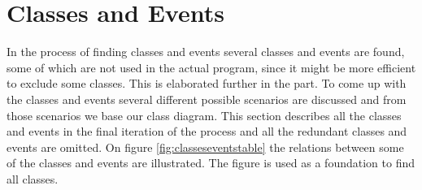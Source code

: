 \section{Classes and Events}
\label{cap:classesevents}
In the process of finding classes and events several classes and events are found, some of which are not used in the actual program, since it might be more efficient to exclude some classes. 
This is elaborated further in the  part. 
To come up with the classes and events several different possible scenarios are discussed and from those scenarios we base our class diagram. 
This section describes all the classes and events in the final iteration of the process and all the redundant classes and events are omitted. 
On figure \ref{fig:classeseventstable} the relations between some of the classes and events are illustrated. The figure is used as a foundation to find all classes. 
